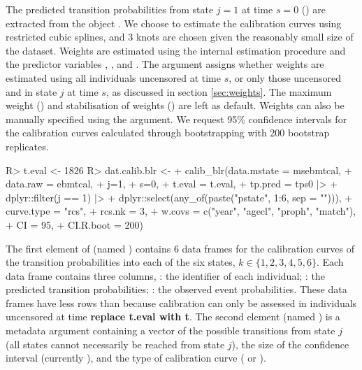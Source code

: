 \documentclass[article,shortnames]{jss}
\begin{document}
The predicted transition probabilities from state $j = 1$ at time $s = 0$ () are extracted from the object . We choose to estimate the calibration curves using restricted cubic splines, and 3 knots are chosen given the reasonably small size of the dataset. Weights are estimated using the internal estimation procedure and the predictor variables , ,  and . The  argument assigns whether weights are estimated using all individuals uncensored at time $s$, or only those uncensored and in state $j$ at time $s$, as discussed in section \ref{sec:weights}. The maximum weight () and stabilisation of weights () are left as default. Weights can also be manually specified using the  argument. We request 95\% confidence intervals for the calibration curves calculated through bootstrapping with 200 bootstrap replicates.

\begin{Schunk}
\begin{Sinput}
R> t.eval <- 1826
R> dat.calib.blr <-
+    calib_blr(data.mstate = msebmtcal,
+                   data.raw = ebmtcal,
+                   j=1,
+                   s=0,
+                   t.eval = t.eval,
+                   tp.pred = tps0 |>
+                     dplyr::filter(j == 1) |>
+                     dplyr::select(any_of(paste("pstate", 1:6, sep = ""))),
+                   curve.type = "rcs",
+                   rcs.nk = 3,
+                   w.covs = c("year", "agecl", "proph", "match"),
+                   CI = 95,
+                   CI.R.boot = 200)
\end{Sinput}
\end{Schunk}

The first element of  (named ) contains 6 data frames for the calibration curves of the transition probabilities into each of the six states, $k \in \{1,2,3,4,5,6\}$. Each data frame contains three columns, : the identifier of each individual; : the predicted transition probabilities; : the observed event probabilities. These data frames have less rows than  because calibration can only be assessed in individuals uncensored at time  \textbf{replace t.eval with t}. The second element (named ) is a metadata argument containing a vector of the possible transitions from state $j$ (all states cannot necessarily be reached from state $j$), the size of the confidence interval (currently ), and the type of calibration curve ( or ).
\end{document}
